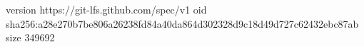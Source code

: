 version https://git-lfs.github.com/spec/v1
oid sha256:a28e270b7be806a26238fd84a40da864d302328d9c18d49d727c62432ebc87ab
size 349692
